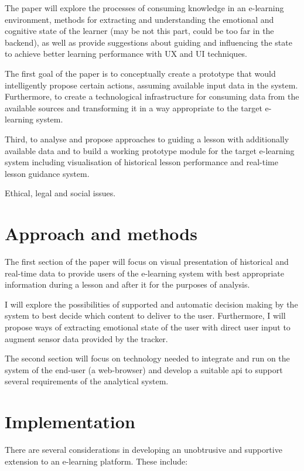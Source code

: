 The paper will explore the processes of consuming knowledge in an e-learning environment, methods for extracting and understanding the emotional and cognitive state of the learner (may be not this part, could be too far in the backend), as well as provide suggestions about guiding and influencing the state to achieve better learning performance with UX and UI techniques.

The first goal of the paper is to conceptually create a prototype that would intelligently propose certain actions, assuming available input data in the system.  
Furthermore, to create a technological infrastructure for consuming data from the available sources and transforming it in a way appropriate to the target e-learning system.

Third, to analyse and propose approaches to guiding a lesson with additionally available data and to build a working prototype module for the target e-learning system including visualisation of historical lesson performance and real-time lesson guidance system.

Ethical, legal and social issues.

\section{Approach and methods}

The first section of the paper will focus on visual presentation of historical and real-time data to provide users of the e-learning system with best appropriate information during a lesson and after it for the purposes of analysis.

I will explore the possibilities of supported and automatic decision making by the system to best decide which content to deliver to the user. Furthermore, I will propose ways of extracting emotional state of the user with direct user input to augment sensor data provided by the tracker.

The second section will focus on technology needed to integrate and run on the system of the end-user (a web-browser) and develop a suitable api to support several requirements of the analytical system.

\section{Implementation}

There are several considerations in developing an unobtrusive and supportive extension to an e-learning platform. These include:

